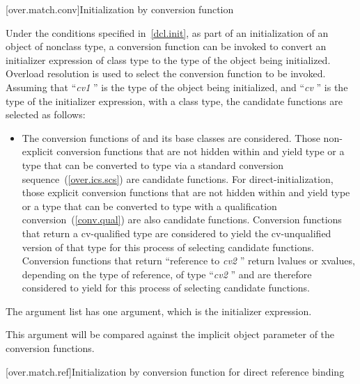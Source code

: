 [over.match.conv]{Initialization by conversion function}%

\pnum
Under the conditions specified in~\ref{dcl.init}, as
part of an initialization of an object of nonclass type,
a conversion function can be invoked to convert an initializer
expression of class type to the type of the object
being initialized.
Overload resolution is used to select the
conversion function to be invoked.
Assuming that ``\textit{cv1} '' is the
type of the object being initialized, and ``\textit{cv} '' is the type
of the initializer expression, with
a class type,
the candidate functions are selected as follows:

\begin{itemize}
\item
The conversion functions of
and its base classes are considered.
Those non-explicit conversion functions that are not hidden
within
and yield type
or a type that can be converted to type
via a standard conversion sequence~(\ref{over.ics.scs})
are candidate functions.
For direct-initialization, those explicit conversion functions that are not
hidden within  and yield type  or a type that can be converted
to type  with a qualification conversion~(\ref{conv.qual}) are also
candidate functions.
Conversion functions that return a cv-qualified type
are considered to yield the cv-unqualified version of that type
for this process of selecting candidate functions.
Conversion functions that return ``reference to
\textit{cv2}
''
return
lvalues or xvalues, depending on the type of reference, of type
``\textit{cv2}
''
and are therefore considered to yield
for this
process of selecting candidate functions.
\end{itemize}

\pnum
The argument list has one argument, which is the initializer expression.
\begin{note}
This argument will be compared against
the implicit object parameter of the conversion functions.
\end{note}

[over.match.ref]{Initialization by conversion function for direct reference binding}%


